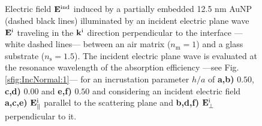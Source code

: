 \begin{figure}[h!]\centering
   \def\svgwidth{.75\textwidth}
   \footnotesize
   \\[-47.5em]
   \hspace*{-.25\textwidth}
       \begin{subfigure}{.25\textwidth}\caption{ } \label{sfig:Near:IncNorm:50:par}\end{subfigure}%
       \begin{subfigure}{.34\textwidth}\caption{ }\label{sfig:Near:IncNorm:50:perp}\end{subfigure}\\[13em]
    \hspace*{-.25\textwidth}
        \begin{subfigure}{.25\textwidth}\caption{ }\label{sfig:Near:IncNorm:00:par}\end{subfigure}%
        \begin{subfigure}{.34\textwidth}\caption{ }\label{sfig:Near:IncNorm:00:perp}\end{subfigure}\\[13em]
   \hspace*{-.25\textwidth}
       \begin{subfigure}{.25\textwidth}\caption{ } \label{sfig:Near:IncNorm:-5:par}\end{subfigure}%
       \begin{subfigure}{.34\textwidth}\caption{ }\label{sfig:Near:IncNorm:-5:perp}\end{subfigure}\\[15em]
   \caption[Induced Electric Field of a 12.5 nm Au Spherical NP embbeded into (supported on) a substrate illuminated at a normal incidence]{
       Electric field $\vb{E}^\text{ind}$ induced by a partially embedded 12.5 nm AuNP (dashed black lines) illuminated by an incident electric plane wave $\vb{E}^\text{i}$ traveling in the $\vb{k}^\text{i}$ direction perpendicular to the interface ---white dashed lines--- between an air matrix ($n_\text{m} = 1$) and a glass substrate ($n_\text{s} = 1.5$). The incident electric plane wave is evaluated at the resonance wavelength of the absorption efficiency ---see Fig. \ref{sfig:IncNormal:1}--- for an incrustation parameter $h/a$ of \textbf{a,b)} $0.50$, \textbf{c,d)} $0.00$ and \textbf{e,f)} $0.50$ and considering an incident electric field \textbf{a,c,e)} $\vb{E}^\text{i}_\parallel$ parallel to the scattering plane and \textbf{b,d,f)} $\vb{E}^\text{i}_\perp$ perpendicular to it.
   }
   \label{fig:Near:IncNorm}
 \end{figure}

